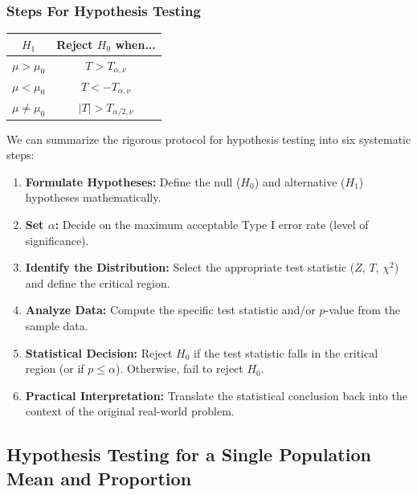 \documentclass{article}
\begin{document}
\subsubsection{Steps For Hypothesis Testing}

\begin{margintable}
\centering
\begin{tabular}{|| c c ||} 
 \hline
 $H_1$ & Reject $H_0$ when... \\ [0.5ex] 
 \hline\hline
 $\mu > \mu_0$ & $T > T_{\alpha, \nu}$ \\
 $\mu < \mu_0$ & $T < -T_{\alpha, \nu}$  \\
 $\mu \neq \mu_0$ & $|T| > T_{\alpha/2, \nu}$ \\ [1ex] 
 \hline
\end{tabular}
\captionsetup{justification=centering}
\caption{\label{tab:tcriticals} Rejection Regions for the $T$-test, for $\nu$ degrees of freedom.}
\end{margintable}

We can summarize the rigorous protocol for hypothesis testing into six systematic steps:

\begin{enumerate}
    \item \textbf{Formulate Hypotheses:} Define the null ($H_0$) and alternative ($H_1$) hypotheses mathematically.
    \item \textbf{Set $\alpha$:} Decide on the maximum acceptable Type I error rate (level of significance).
    \item \textbf{Identify the Distribution:} Select the appropriate test statistic ($Z$, $T$, $\chi^2$) and define the critical region.
    \item \textbf{Analyze Data:} Compute the specific test statistic and/or $p$-value from the sample data.
    \item \textbf{Statistical Decision:} Reject $H_0$ if the test statistic falls in the critical region (or if $p \leq \alpha$). Otherwise, fail to reject $H_0$.
    \item \textbf{Practical Interpretation:} Translate the statistical conclusion back into the context of the original real-world problem.
\end{enumerate}

\subsection{Hypothesis Testing for a Single Population Mean and Proportion}
\end{document}
